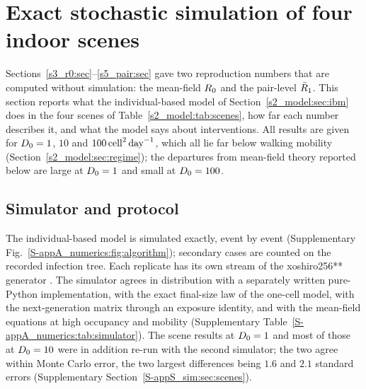 \section{Exact stochastic simulation of four indoor scenes}\label{s6_scenes:sec}

Sections~\ref{s3_r0:sec}--\ref{s5_pair:sec} gave two reproduction numbers that are computed without simulation:
the mean-field $R_0$ and the pair-level $\bar{R}_1$. This section reports what the individual-based model of
Section~\ref{s2_model:sec:ibm} does in the four scenes of Table~\ref{s2_model:tab:scenes}, how far each number
describes it, and what the model says about interventions. All results are given for $D_0=1$, $10$ and
$100\,\mathrm{cell}^2\,\mathrm{day}^{-1}$, which all lie far below walking mobility (Section~\ref{s2_model:sec:regime}); the departures from
mean-field theory reported below are large at $D_0=1$ and small at $D_0=100$.

\subsection{Simulator and protocol}\label{s6_scenes:sec:protocol}

The individual-based model is simulated exactly, event by event (Supplementary
Fig.~\ref{S-appA_numerics:fig:algorithm}); secondary cases are counted on the recorded infection tree. Each
replicate has its own stream of the xoshiro256** generator \citep{blackman2021scrambled}. The simulator agrees in
distribution with a separately written pure-Python implementation, with the exact final-size law of the
one-cell model, with the next-generation matrix through an exposure identity, and with the mean-field equations
at high occupancy and mobility (Supplementary Table~\ref{S-appA_numerics:tab:simulator}). The scene results at
$D_0=1$ and most of those at $D_0=10$ were in addition re-run with the second simulator; the two agree within
Monte Carlo error, the two largest differences being $1.6$ and $2.1$ standard errors (Supplementary
Section~\ref{S-appS_sim:sec:scenes}).

